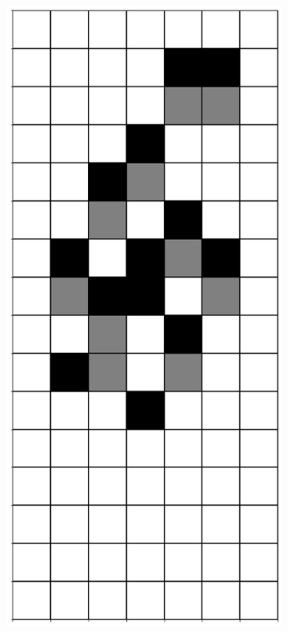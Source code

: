 \documentclass[12pt]{article}
\numberwithin{figure}{section} %
\begin{document}
\begin{figure}[H]
\begin{subfigure}{0.19\textwidth}
     \subcaption{}
   \end{subfigure}
           \begin{subfigure}{0.19\textwidth}
     \centering
     \includegraphics[width=\linewidth]{Section4/19.4}
     \subcaption{}
   \end{subfigure}
      \newline
   \setcounter{subfigure}{0}
   

\end{figure}
\end{document}

